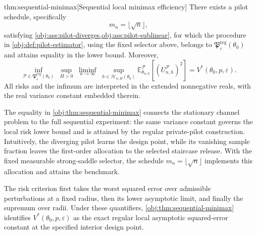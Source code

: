 \begin{theoremv}{thm:sequential-minimax}[Sequential local minimax efficiency]
There exists a pilot schedule, specifically
\[
m_n=\lfloor\sqrt n\rfloor,
\]
satisfying \cref{obj:ass:pilot-diverges,obj:ass:pilot-sublinear}, for which the procedure in \cref{obj:def:pilot-estimator}, using the fixed selector above, belongs to \(\mathfrak P^{\mathrm{reg}}_{\varepsilon}(\theta_0)\) and attains equality in the lower bound. Moreover,
\[
\inf_{\mathcal P\in\mathfrak P^{\mathrm{reg}}_{\varepsilon}(\theta_0)}
\;\sup_{H>0}\;\liminf_{n\to\infty}\;
\sup_{h\in\mathcal H_{n,H}(\theta_0)}
\mathbb E_{\theta_{n,h}}^{\mathcal P}
\!\left[(U_{n,h}^{\mathcal P})^2\right]
=
V^*(\theta_0,p,\varepsilon).
\]
All risks and the infimum are interpreted in the extended nonnegative reals, with the real variance constant embedded therein.
\end{theoremv}

The equality in \cref{obj:thm:sequential-minimax} connects the stationary channel problem to the full sequential experiment: the same variance constant governs the local risk lower bound and is attained by the regular private-pilot construction. Intuitively, the diverging pilot learns the design point, while its vanishing sample fraction leaves the first-order allocation to the selected staircase release. With the fixed measurable strong-saddle selector, the schedule \(m_n=\lfloor\sqrt n\rfloor\) implements this allocation and attains the benchmark.

The risk criterion first takes the worst squared error over admissible perturbations at a fixed radius, then its lower asymptotic limit, and finally the supremum over radii. Under these quantifiers, \cref{obj:thm:sequential-minimax} identifies \(V^*(\theta_0,p,\varepsilon)\) as the exact regular local asymptotic squared-error constant at the specified interior design point.
